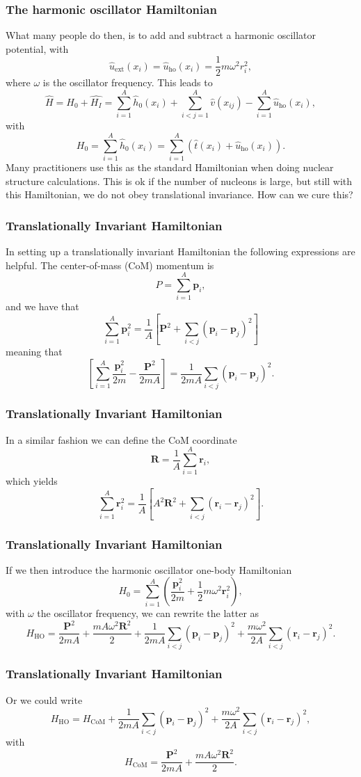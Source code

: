 \documentclass[compress]{beamer}
\renewcommand{\vec}[1]{\mathbf{#1}}
\renewcommand{\vec}[1]{\boldsymbol{#1}}
\begin{document}
\frame
{
  \frametitle{The harmonic oscillator Hamiltonian}
\begin{small}
{\scriptsize
What many people do then, is to add and subtract a harmonic oscillator potential,
with 
\[
\hat{u}_{\mathrm{ext}}(x_i)=\hat{u}_{\mathrm{ho}}(x_i)= \frac{1}{2}m\omega^2 r_i^2,
\]
where $\omega$ is the oscillator frequency. This leads to 
\[
    \hat{H} = \hat{H_0} + \hat{H_I} 
    = \sum_{i=1}^A \hat{h}_0(x_i) + \sum_{i<j=1}^A \hat{v}(x_{ij})-\sum_{i=1}^A\hat{u}_{\mathrm{ho}}(x_i),
\]
with 
\[
  H_0=\sum_{i=1}^A \hat{h}_0(x_i) =  \sum_{i=1}^A\left(\hat{t}(x_i) + \hat{u}_{\mathrm{ho}}(x_i)\right).
\]
Many practitioners use this as the standard Hamiltonian when doing nuclear structure calculations. 
This is ok if the number of nucleons is large, but still with this Hamiltonian, we do not obey translational invariance.  How can we cure this?
}
\end{small}
}

 \frame
 {
 \frametitle{Translationally Invariant Hamiltonian}
 In setting up a translationally invariant Hamiltonian  
 the following expressions are helpful.
 The center-of-mass (CoM)  momentum is
 \[
    P=\sum_{i=1}^A\vec{p}_i,
 \]
 and we have that
 \[
 \sum_{i=1}^A\vec{p}_i^2 =
 \frac{1}{A}\left[\vec{P}^2+\sum_{i<j}(\vec{p}_i-\vec{p}_j)^2\right]
 \]
 meaning that
 \[
 \left[\sum_{i=1}^A\frac{\vec{p}_i^2}{2m} -\frac{\vec{P}^2}{2mA}\right]
 =\frac{1}{2mA}\sum_{i<j}(\vec{p}_i-\vec{p}_j)^2.
 \]
 }


 \frame
 {
 \frametitle{Translationally Invariant Hamiltonian}
 In a similar fashion we can define the CoM coordinate
 \[
     \vec{R}=\frac{1}{A}\sum_{i=1}^{A}\vec{r}_i,
 \]
 which yields
 \[
 \sum_{i=1}^A\vec{r}_i^2 =
 \frac{1}{A}\left[A^2\vec{R}^2+\sum_{i<j}(\vec{r}_i-\vec{r}_j)^2\right].
 \]

 }


 \frame
 {
 \frametitle{Translationally Invariant Hamiltonian}
 If we then introduce the harmonic oscillator one-body Hamiltonian
 \[
      H_0= \sum_{i=1}^A\left(\frac{\vec{p}_i^2}{2m}+
	   \frac{1}{2}m\omega^2\vec{r}_i^2\right),
 \]
 with $\omega$ the oscillator frequency,
 we can rewrite the latter as 
 \[
      H_{\mathrm{HO}}= \frac{\vec{P}^2}{2mA}+\frac{mA\omega^2\vec{R}^2}{2}
	    +\frac{1}{2mA}\sum_{i<j}(\vec{p}_i-\vec{p}_j)^2
	    +\frac{m\omega^2}{2A}\sum_{i<j}(\vec{r}_i-\vec{r}_j)^2.
     \label{eq:obho}
 \]
 }


 \frame
 {
 \frametitle{Translationally Invariant Hamiltonian}
 Or we could write 
 \[
 H_{\mathrm{HO}}= H_{\mathrm{CoM}}+\frac{1}{2mA}\sum_{i<j}(\vec{p}_i-\vec{p}_j)^2
	    +\frac{m\omega^2}{2A}\sum_{i<j}(\vec{r}_i-\vec{r}_j)^2,
 \]
 with 
 \[
      H_{\mathrm{CoM}}= \frac{\vec{P}^2}{2mA}+\frac{mA\omega^2\vec{R}^2}{2}.
 \]

 }
\end{document}
